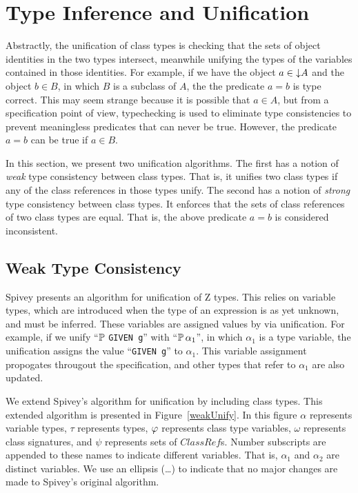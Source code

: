 \section{Type Inference and Unification}
\label{inference}

Abstractly, the unification of class types is checking that the
sets of object identities in the two types intersect, meanwhile
unifying the types of the variables contained in those identities. For
example, if we have the object $a \in \mathord\downarrow A$ and the object $b
\in B$, in which $B$ is a subclass of $A$, the the predicate $a
= b$ is type correct. This may seem strange because it is possible
that $a \in A$, but from a specification point of view,
typechecking is used to eliminate type consistencies to prevent
meaningless predicates that can never be true. However, the predicate
$a = b$ can be true if $a \in B$.

In this section, we present two unification algorithms. The first has
a notion of {\em weak} type consistency between class types. That is,
it unifies two class types if any of the class references in those
types unify. The second has a notion of {\em strong} type consistency
between class types. It enforces that the sets of class references of
two class types are equal. That is, the above predicate $a = b$
is considered inconsistent. 

\subsection{Weak Type Consistency}

Spivey \cite{spivey90} presents an algorithm for unification of Z
types. This relies on variable types, which are introduced when the
type of an expression is as yet unknown, and must be
inferred. These variables are assigned values by via unification. For
example, if we unify ``$\power$ {\tt GIVEN g}'' with ``$\power \alpha_1$'', in
which $\alpha_1$ is a type variable, the unification assigns the value
``{\tt GIVEN g}'' to $\alpha_1$. This variable assignment propogates
througout the specification, and other types that refer to $\alpha_1$
are also updated.

We extend Spivey's algorithm for unification by including class
types. This extended algorithm is presented in
Figure~\ref{weakUnify}. In this figure $\alpha$ represents variable
types, $\tau$ represents types, $\varphi$ represents class type
variables, $\omega$ represents class signatures, and $\psi$ represents
sets of $ClassRef$s. Number subscripts are appended to these
names to indicate different variables. That is, $\alpha_1$ and
$\alpha_2$ are distinct variables. We use an ellipsis (\ldots) to
indicate that no major changes are made to Spivey's original
algorithm.

